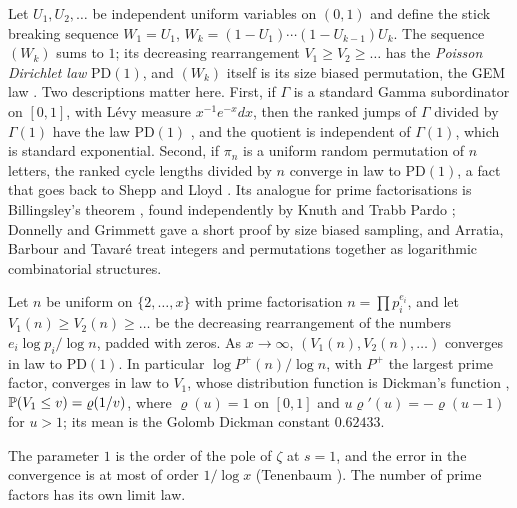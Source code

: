 Let $U_1,U_2,\dots$ be independent uniform variables on $(0,1)$ and define the stick breaking sequence $W_1=U_1$, $W_k=(1-U_1)\cdots(1-U_{k-1})U_k$. The sequence $(W_k)$ sums to $1$; its decreasing rearrangement $V_1\ge V_2\ge\dots$ has the \emph{Poisson Dirichlet law} $\mathrm{PD}(1)$, and $(W_k)$ itself is its size biased permutation, the GEM law \cite{kingman1993,pitman2006}. Two descriptions matter here. First, if $\Gamma$ is a standard Gamma subordinator on $[0,1]$, with L\'evy measure $x^{-1}e^{-x}dx$, then the ranked jumps of $\Gamma$ divided by $\Gamma(1)$ have the law $\mathrm{PD}(1)$ \cite{kingman1975}, and the quotient is independent of $\Gamma(1)$, which is standard exponential. Second, if $\pi_n$ is a uniform random permutation of $n$ letters, the ranked cycle lengths divided by $n$ converge in law to $\mathrm{PD}(1)$, a fact that goes back to Shepp and Lloyd \cite{shepplloyd1966}. Its analogue for prime factorisations is Billingsley's theorem \cite{billingsley1972}, found independently by Knuth and Trabb Pardo \cite{knuthtrabbpardo1976}; Donnelly and Grimmett \cite{donnellygrimmett1993} gave a short proof by size biased sampling, and Arratia, Barbour and Tavar\'e \cite{arratiabarbourtavare2003} treat integers and permutations together as logarithmic combinatorial structures.

\begin{theorem}\label{thm:pdbillingsley}
Let $n$ be uniform on $\{2,\dots,x\}$ with prime factorisation $n=\prod p_i^{e_i}$, and let $V_1(n)\ge V_2(n)\ge\dots$ be the decreasing rearrangement of the numbers $e_i\log p_i/\log n$, padded with zeros. As $x\to\infty$, $(V_1(n),V_2(n),\dots)$ converges in law to $\mathrm{PD}(1)$. In particular $\log P^+(n)/\log n$, with $P^+$ the largest prime factor, converges in law to $V_1$, whose distribution function is Dickman's function \cite{dickman1930}, $\mathbb{P}(V_1\le v)=\varrho(1/v)$, where $\varrho(u)=1$ on $[0,1]$ and $u\varrho'(u)=-\varrho(u-1)$ for $u>1$; its mean is the Golomb Dickman constant $0.62433$.
\end{theorem}

The parameter $1$ is the order of the pole of $\zeta$ at $s=1$, and the error in the convergence is at most of order $1/\log x$ (Tenenbaum \cite{tenenbaum2000}). The number of prime factors has its own limit law.

